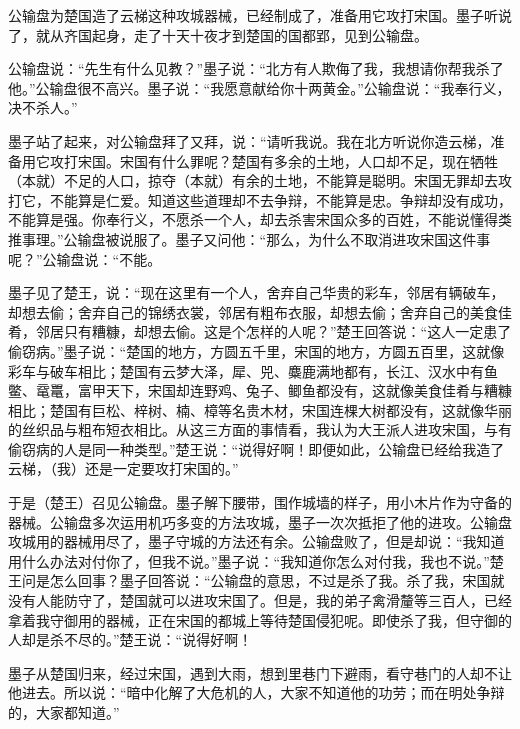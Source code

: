 \documentclass[12pt,UTF-8,openany]{ctexbook}
\begin{document}
\begin{normalsize}
    
    公输盘为楚国造了云梯这种攻城器械，已经制成了，准备用它攻打宋国。墨子听说了，就从齐国起身，走了十天十夜才到楚国的国都郢，见到公输盘。
    
    公输盘说：“先生有什么见教？”墨子说：“北方有人欺侮了我，我想请你帮我杀了他。”公输盘很不高兴。墨子说：“我愿意献给你十两黄金。”公输盘说：“我奉行义，决不杀人。”
    
    墨子站了起来，对公输盘拜了又拜，说：“请听我说。我在北方听说你造云梯，准备用它攻打宋国。宋国有什么罪呢？楚国有多余的土地，人口却不足，现在牺牲（本就）不足的人口，掠夺（本就）有余的土地，不能算是聪明。宋国无罪却去攻打它，不能算是仁爱。知道这些道理却不去争辩，不能算是忠。争辩却没有成功，不能算是强。你奉行义，不愿杀一个人，却去杀害宋国众多的百姓，不能说懂得类推事理。”公输盘被说服了。墨子又问他：“那么，为什么不取消进攻宋国这件事呢？”公输盘说：“不能。
    
    墨子见了楚王，说：“现在这里有一个人，舍弃自己华贵的彩车，邻居有辆破车，却想去偷；舍弃自己的锦绣衣裳，邻居有粗布衣服，却想去偷；舍弃自己的美食佳肴，邻居只有糟糠，却想去偷。这是个怎样的人呢？”楚王回答说：“这人一定患了偷窃病。”墨子说：“楚国的地方，方圆五千里，宋国的地方，方圆五百里，这就像彩车与破车相比；楚国有云梦大泽，犀、兕、麋鹿满地都有，长江、汉水中有鱼鳖、鼋鼍，富甲天下，宋国却连野鸡、兔子、鲫鱼都没有，这就像美食佳肴与糟糠相比；楚国有巨松、梓树、楠、樟等名贵木材，宋国连棵大树都没有，这就像华丽的丝织品与粗布短衣相比。从这三方面的事情看，我认为大王派人进攻宋国，与有偷窃病的人是同一种类型。”楚王说：“说得好啊！即便如此，公输盘已经给我造了云梯，（我）还是一定要攻打宋国的。”
    
    于是（楚王）召见公输盘。墨子解下腰带，围作城墙的样子，用小木片作为守备的器械。公输盘多次运用机巧多变的方法攻城，墨子一次次抵拒了他的进攻。公输盘攻城用的器械用尽了，墨子守城的方法还有余。公输盘败了，但是却说：“我知道用什么办法对付你了，但我不说。”墨子说：“我知道你怎么对付我，我也不说。”楚王问是怎么回事？墨子回答说：“公输盘的意思，不过是杀了我。杀了我，宋国就没有人能防守了，楚国就可以进攻宋国了。但是，我的弟子禽滑釐等三百人，已经拿着我守御用的器械，正在宋国的都城上等待楚国侵犯呢。即使杀了我，但守御的人却是杀不尽的。”楚王说：“说得好啊！
    
    墨子从楚国归来，经过宋国，遇到大雨，想到里巷门下避雨，看守巷门的人却不让他进去。所以说：“暗中化解了大危机的人，大家不知道他的功劳；而在明处争辩的，大家都知道。”
    
\end{normalsize}
\end{document}
